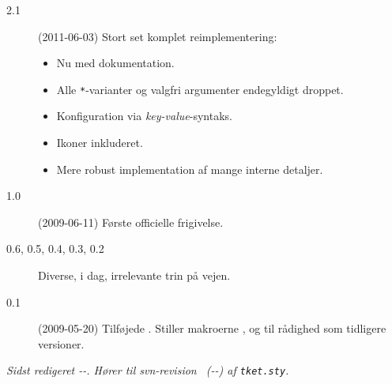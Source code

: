 \documentclass[a4paper,article,oneside]{memoir}
\newcommand{\pakkenavn}[1]{\textsf{#1}}
\begin{document}
\begin{description}
\item[2.1] (2011-06-03) Stort set komplet reimplementering:
  \begin{itemize}
  \item Nu med dokumentation.
  \item Alle \texttt{*}-varianter og valgfri argumenter endegyldigt droppet.
  \item Konfiguration via \textit{key-value}-syntaks.
  \item Ikoner inkluderet.
  \item Mere robust implementation af mange interne detaljer.
  \end{itemize}
\item[1.0] (2009-06-11) Første officielle frigivelse.
\item[0.6, 0.5, 0.4, 0.3, 0.2] Diverse, i dag, irrelevante trin på vejen.
\item[0.1] (2009-05-20) Tilføjede . Stiller
  makroerne ,  og  til rådighed som
  tidligere versioner.
\end{description}

\vfill
{}
\noindent\small\itshape 
Sidst redigeret \svnyear-\svnmonth-\svnday.%
Hører til svn-revision~\svncgrev{} (\svncgyear-\svncgmonth-\svncgday) af \texttt{tket.sty}.

\end{document}
